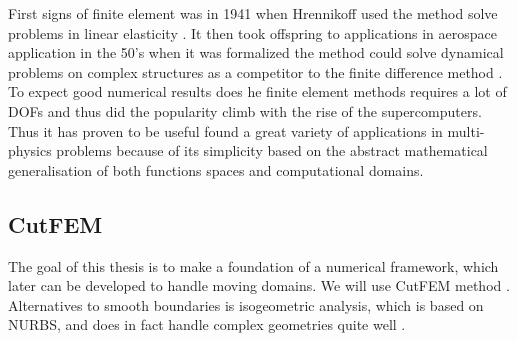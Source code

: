 First signs of finite element was in 1941 when Hrennikoff used the method solve problems in linear elasticity \cite{hrennikoff1941solution}. It then took offspring to applications in aerospace application in the 50's when it was formalized the method
could solve dynamical problems on complex structures as a competitor to the finite difference method
\cite{argyris1960energy, turner1956stiffness, liu2022eighty}. To expect good numerical results does he finite element methods requires a lot of DOFs and thus did the popularity climb with the rise of the supercomputers. Thus it has proven to be
useful found a great
variety of applications in multi-physics problems because of its simplicity based on the abstract mathematical generalisation of both functions spaces and computational domains.


\subsection{CutFEM}%
\label{sub:cutfem}
The goal of this thesis is to make a foundation of a numerical framework, which later can be developed to handle moving domains. We will use CutFEM method \cite{burman2015cutfem}.
Alternatives to smooth boundaries is isogeometric analysis, which is based on NURBS, and does in fact handle complex geometries quite well \cite{hughes2005isogeometric}.





